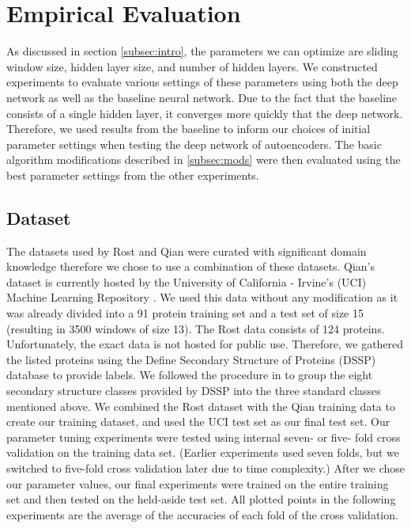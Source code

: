 \documentclass[letterpaper,twocolumn,12pt]{article}
\begin{document}
\section{Empirical Evaluation}
As discussed in section \ref{subsec:intro}, the parameters we can optimize are sliding window size, hidden layer size, and number of hidden layers.
We constructed experiments to evaluate various settings of these parameters using both the deep network as well as the baseline neural network.
Due to the fact that the baseline consists of a single hidden layer, it converges more quickly that the deep network.
Therefore, we used results from the baseline to inform our choices of initial parameter settings when testing the deep network of autoencoders.
The basic algorithm modifications described in \ref{subsec:mods} were then evaluated using the best parameter settings from the other experiments.

\subsection{Dataset}
The datasets used by Rost and Qian were curated with significant domain knowledge therefore we chose to use a combination of these datasets.
Qian's dataset is currently hosted by the University of California - Irvine's (UCI) Machine Learning Repository \cite{uci}.
We used this data without any modification as it was already divided into a 91 protein training set and a test set of size 15 (resulting in 3500 windows of size 13).
The Rost data consists of 124 proteins.
Unfortunately, the exact data is not hosted for public use.
Therefore, we gathered the listed proteins using the Define Secondary Structure of Proteins (DSSP) database \cite{DSSP} \cite{DSSP2} to provide labels.
We followed the procedure in \cite{Rost} to group the eight secondary structure classes provided by DSSP into the three standard classes mentioned above.
We combined the Rost dataset with the Qian training data to create our training dataset, and used the UCI test set as our final test set.
Our parameter tuning experiments were tested using internal seven- or five- fold cross validation on the training data set.
(Earlier experiments used seven folds, but we switched to five-fold cross validation later due to time complexity.)
After we chose our parameter values, our final experiments were trained on the entire training set and then tested on the held-aside test set.
All plotted points in the following experiments are the average of the accuracies of each fold of the cross validation.
\end{document}
